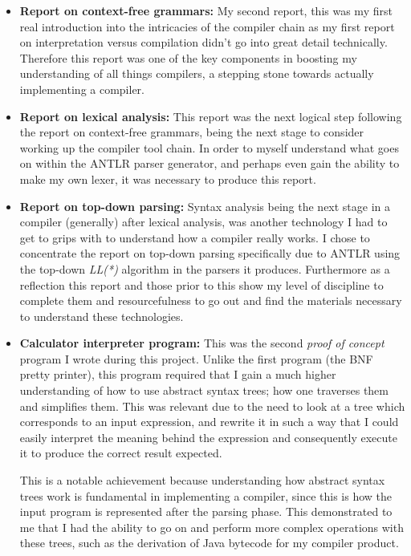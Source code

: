 \documentclass[a4paper, 11pt]{article}
\begin{document}
\begin{itemize}
\item{\textbf{Report on context-free grammars:} My second report, this was my first real introduction into the intricacies of the compiler chain as my first report on interpretation versus compilation didn't go into great detail technically. Therefore this report was one of the key components in boosting my understanding of all things compilers, a stepping stone towards actually implementing a compiler.}

\item{\textbf{Report on lexical analysis:} This report was the next logical step following the report on context-free grammars, being the next stage to consider working up the compiler tool chain. In order to myself understand what goes on within the ANTLR parser generator, and perhaps even gain the ability to make my own lexer, it was necessary to produce this report.}

\item{\textbf{Report on top-down parsing:} Syntax analysis being the next stage in a compiler (generally) after lexical analysis, was another technology I had to get to grips with to understand how a compiler really works. I chose to concentrate the report on top-down parsing specifically due to ANTLR using the top-down \textit{LL(*)} algorithm in the parsers it produces. Furthermore as a reflection this report and those prior to this show my level of discipline to complete them and resourcefulness to go out and find the materials necessary to understand these technologies.}

\item{\textbf{Calculator interpreter program:} This was the second \textit{proof of concept} program I wrote during this project. Unlike the first program (the BNF pretty printer), this program required that I gain a much higher understanding of how to use abstract syntax trees; how one traverses them and simplifies them. This was relevant due to the need to look at a tree which corresponds to an input expression, and rewrite it in such a way that I could easily interpret the meaning behind the expression and consequently execute it to produce the correct result expected. 

This is a notable achievement because understanding how abstract syntax trees work is fundamental in implementing a compiler, since this is how the input program is represented after the parsing phase. This demonstrated to me that I had the ability to go on and perform more complex operations with these trees, such as the derivation of Java bytecode for my compiler product.}


\end{itemize}
\end{document}
